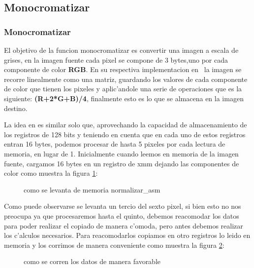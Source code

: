 \subsection{Monocromatizar}
\subsubsection{Monocromatizar  }
El objetivo de la funcion monocromatizar es convertir una imagen a escala de grises, en la imagen fuente
cada pixel se compone de 3 bytes,uno por cada componente de color \textbf{RGB}. En su respectiva implementacion en 
\C \ la imagen se recorre linealmente como una matriz, guardando los valores de cada componente de color
que tienen los pixeles y aplic'andole una serie de operaciones que es la siguiente:
\textbf{(R+2*G+B)/4}, finalmente esto es lo que se almacena en la imagen destino.

La idea en \ass es similar solo que, aprovechando la capacidad de almacenamiento de los registros de 128 bits
y teniendo en cuenta que en cada uno de estos registros entran 16 bytes, podemos procesar de hasta 5 pixeles
por cada lectura de memoria, en lugar de 1. Inicialmente cuando leemos en memoria de la imagen fuente, cargamos 16 bytes en un registro de xmm dejando 
las componentes de color como muestra la figura \ref{est:m-uno}:

\begin{figure}[hb]
\caption{como se levanta de memoria normalizar\_asm}
\label{est:m-uno}
\end{figure}
Como puede observarse se levanta un tercio del sexto pixel, si bien esto no nos preocupa ya que procesaremos
hasta el quinto, debemos reacomodar los datos para poder realizar el copiado de manera c'omoda, pero
antes debemos realizar los c'alculos necesarios. Para reacomodarlos  copiamos en otro registros
lo leido en memoria y los corrimos de manera conveniente como muestra la figura \ref{est:m-dos}: 
\begin{figure}[hb]
\caption{como se corren los datos de manera favorable}
\label{est:m-dos}
\end{figure}

